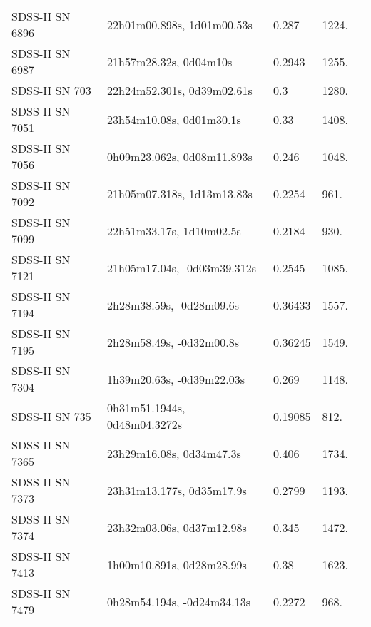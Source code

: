 \begin{longtable}{lllll}
  SDSS-II SN 6896 &     22h01m00.898s, 1d01m00.53s &    0.287 &          1224. &    \citet{2011ApJ...738..162S} \\
  SDSS-II SN 6987 &         21h57m28.32s, 0d04m10s &   0.2943 &          1255. &    \citet{2016SDSSD.C...0000:} \\
   SDSS-II SN 703 &     22h24m52.301s, 0d39m02.61s &      0.3 &          1280. &    \citet{2011ApJ...738..162S} \\
  SDSS-II SN 7051 &       23h54m10.08s, 0d01m30.1s &     0.33 &          1408. &    \citet{2011ApJ...738..162S} \\
  SDSS-II SN 7056 &     0h09m23.062s, 0d08m11.893s &    0.246 &          1048. &    \citet{2011ApJ...738..162S} \\
  SDSS-II SN 7092 &     21h05m07.318s, 1d13m13.83s &   0.2254 &           961. &    \citet{2011ApJ...738..162S} \\
  SDSS-II SN 7099 &       22h51m33.17s, 1d10m02.5s &   0.2184 &           930. &    \citet{2011ApJ...738..162S} \\
  SDSS-II SN 7121 &    21h05m17.04s, -0d03m39.312s &   0.2545 &          1085. &    \citet{2011ApJ...738..162S} \\
  SDSS-II SN 7194 &       2h28m38.59s, -0d28m09.6s &  0.36433 &          1557. &    \citet{2016SDSSD.C...0000:} \\
  SDSS-II SN 7195 &       2h28m58.49s, -0d32m00.8s &  0.36245 &          1549. &    \citet{2016SDSSD.C...0000:} \\
  SDSS-II SN 7304 &      1h39m20.63s, -0d39m22.03s &    0.269 &          1148. &    \citet{2011ApJ...738..162S} \\
   SDSS-II SN 735 &   0h31m51.1944s, 0d48m04.3272s &  0.19085 &           812. &    \citet{2016SDSSD.C...0000:} \\
  SDSS-II SN 7365 &       23h29m16.08s, 0d34m47.3s &    0.406 &          1734. &    \citet{2010ApJ...713.1026D} \\
  SDSS-II SN 7373 &      23h31m13.177s, 0d35m17.9s &   0.2799 &          1193. &    \citet{2011ApJ...738..162S} \\
  SDSS-II SN 7374 &      23h32m03.06s, 0d37m12.98s &    0.345 &          1472. &    \citet{2011ApJ...738..162S} \\
  SDSS-II SN 7413 &      1h00m10.891s, 0d28m28.99s &     0.38 &          1623. &    \citet{2010ApJ...713.1026D} \\
  SDSS-II SN 7479 &     0h28m54.194s, -0d24m34.13s &   0.2272 &           968. &    \citet{2011ApJ...738..162S} \\

\end{longtable}
